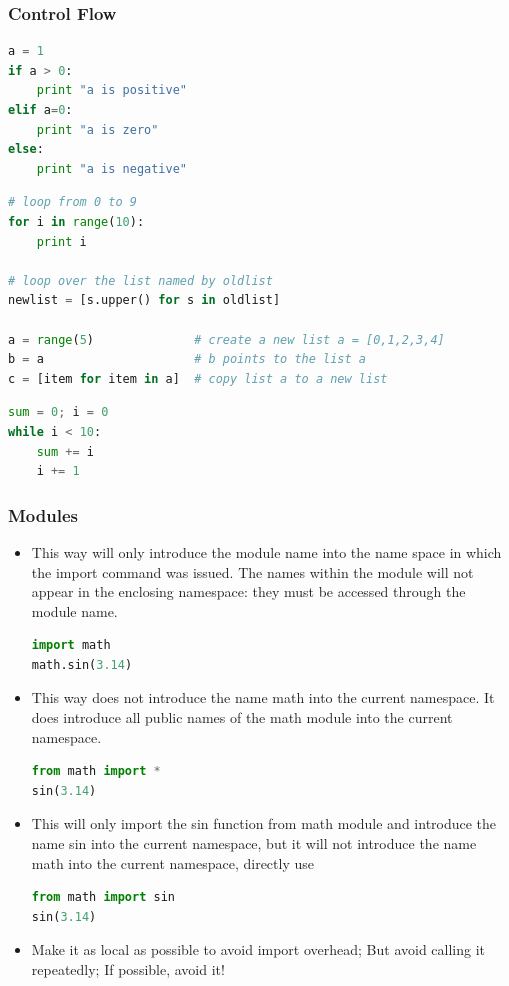 \begin{frame}[fragile]
  \MyLogo
  \frametitle{Control Flow}  
\small

\medskip
{}
\begin{lstlisting}[language=python]
a = 1
if a > 0:
	print "a is positive"
elif a=0:
	print "a is zero"
else:
	print "a is negative"
\end{lstlisting}			

\begin{lstlisting}[language=python]
# loop from 0 to 9
for i in range(10):
	print i
	
# loop over the list named by oldlist
newlist = [s.upper() for s in oldlist]

a = range(5)              # create a new list a = [0,1,2,3,4]
b = a                     # b points to the list a
c = [item for item in a]  # copy list a to a new list
\end{lstlisting}	
	
\begin{lstlisting}[language=python]
sum = 0; i = 0
while i < 10:
	sum += i
	i += 1
\end{lstlisting}

\end{frame}


\begin{frame}[fragile]
  \MyLogo
  \frametitle{Modules}  
\small		

\begin{itemize}
\item This way will only introduce the module name into the name space in which the import command was issued. The names within the module will not appear in the enclosing namespace: they must be accessed through the module name.
\begin{lstlisting}[language=python,numbers=none] 
import math
math.sin(3.14)
\end{lstlisting}

\item This way does not introduce the name math into the current namespace. It does  introduce all public names of the math module into the current namespace.\begin{lstlisting}[language=python,numbers=none] 
from math import *
sin(3.14)
\end{lstlisting}

\item This will only import the sin function from math module and introduce the name sin into the current namespace, but it will not introduce the name math into the current namespace, directly use
\begin{lstlisting}[language=python,numbers=none] 
from math import sin
sin(3.14)
\end{lstlisting}

\pause 

\item Make it as local as possible to avoid import overhead; But avoid calling it repeatedly; \alert{If possible, avoid it!}
\end{itemize}

\end{frame}

